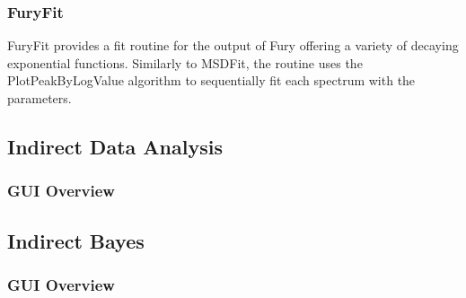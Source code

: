 \documentclass[paper=a4, fontsize=11pt]{scrartcl}	%
\numberwithin{equation}{section}															%
\numberwithin{figure}{section}																%
\numberwithin{table}{section}																%
\begin{document}
\subsubsection{FuryFit}
FuryFit provides a fit routine for the output of Fury offering a variety of decaying exponential functions. Similarly to MSDFit, the routine uses the PlotPeakByLogValue algorithm to sequentially fit each spectrum with the parameters.

\subsection{Indirect Data Analysis}


\subsubsection{GUI Overview}
\label{subsubsec:IDA-GUI-Overview}
%
\subsection{Indirect Bayes}
\subsubsection{GUI Overview}
\label{subsubsec:Bayes-GUI-Overview}
%
\end{document}
